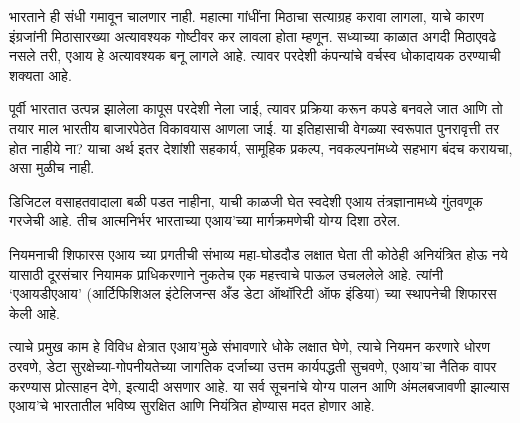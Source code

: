 भारताने ही संधी गमावून चालणार नाही. महात्मा गांधींना मिठाचा सत्याग्रह करावा लागला, याचे कारण इंग्रजांनी मिठासारख्या अत्यावश्यक गोष्टीवर कर लावला होता म्हणून. सध्याच्या काळात अगदी मिठाएवढे नसले तरी, एआय हे अत्यावश्यक बनू लागले आहे. त्यावर परदेशी कंपन्यांचे वर्चस्व धोकादायक ठरण्याची शक्यता आहे.

पूर्वी भारतात उत्पन्न झालेला कापूस परदेशी नेला जाई, त्यावर प्रक्रिया करून कपडे बनवले जात आणि तो तयार माल भारतीय बाजारपेठेत विकावयास आणला जाई. या इतिहासाची वेगळ्या स्वरूपात पुनरावृत्ती तर होत नाहीये ना? याचा अर्थ इतर देशांशी सहकार्य, सामूहिक प्रकल्प, नवकल्पनांमध्ये सहभाग बंदच करायचा, असा मुळीच नाही.

डिजिटल वसाहतवादाला बळी पडत नाहीना, याची काळजी घेत स्वदेशी एआय तंत्रज्ञानामध्ये गुंतवणूक गरजेची आहे. तीच आत्मनिर्भर भारताच्या एआय'च्या मार्गक्रमणेची योग्य दिशा ठरेल.

नियमनाची शिफारस
एआय च्या प्रगतीची संभाव्य महा-घोडदौड लक्षात घेता ती कोठेही अनियंत्रित होऊ नये यासाठी दूरसंचार नियामक प्राधिकरणाने नुकतेच एक महत्त्वाचे पाऊल उचललेले आहे. त्यांनी `एआयडीएआय' (आर्टिफिशिअल इंटेलिजन्स अँड डेटा ऑथॉरिटी ऑफ इंडिया) च्या स्थापनेची शिफारस केली आहे.

त्याचे प्रमुख काम हे विविध क्षेत्रात एआय'मुळे संभावणारे धोके लक्षात घेणे, त्याचे नियमन करणारे धोरण ठरवणे, डेटा सुरक्षेच्या-गोपनीयतेच्या जागतिक दर्जाच्या उत्तम कार्यपद्धती सुचवणे, एआय'चा नैतिक वापर करण्यास प्रोत्साहन देणे, इत्यादी असणार आहे. या सर्व सूचनांचे योग्य पालन आणि अंमलबजावणी झाल्यास एआय'चे भारतातील भविष्य सुरक्षित आणि नियंत्रित होण्यास मदत होणार आहे.

